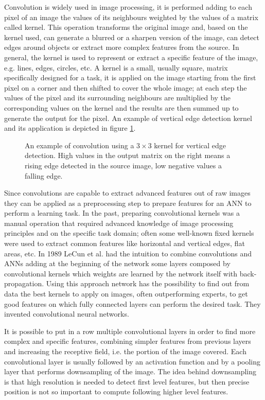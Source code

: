 Convolution is widely used in image processing, it is performed adding to each pixel of an image the values of its neighbours weighted by the values of a matrix called kernel.
This operation transforms the original image and, based on the kernel used, can generate a blurred or a sharpen version of the image, can detect edges around objects or extract more complex features from the source.
In general, the kernel is used to represent or extract a specific feature of the image, e.g. lines, edges, circles, etc.
A kernel is a small, usually square, matrix specifically designed for a task, it is applied on the image starting from the first pixel on a corner and then shifted to cover the whole image; at each step the values of the pixel and its surrounding neighbours are multiplied by the corresponding values on the kernel and the results are then summed up to generate the output for the pixel.
An example of vertical edge detection kernel and its application is depicted in figure \ref{fig:convolution}.

\begin{figure}
    \centering
    \resizebox{0.8\textwidth}{!}{  }
    \caption{An example of convolution using a $3\times3$ kernel for vertical edge detection. High values in the output matrix on the right means a rising edge detected in the source image, low negative values a falling edge.}
    \label{fig:convolution}
\end{figure}

Since convolutions are capable to extract advanced features out of raw images they can be applied as a preprocessing step to prepare features for an ANN to perform a learning task.
In the past, preparing convolutional kernels was a manual operation that required advanced knowledge of image processing principles and on the specific task domain; often some well-known fixed kernels were used to extract common features like horizontal and vertical edges, flat areas, etc.
In 1989 LeCun et al. \cite{LeCun1989} had the intuition to combine convolutions and ANNs adding at the beginning of the network some layers composed by convolutional kernels which weights are learned by the network itself with back-propagation.
Using this approach network has the possibility to find out from data the best kernels to apply on images, often outperforming experts, to get good features on which fully connected layers can perform the desired task.
They invented convolutional neural networks.

It is possible to put in a row multiple convolutional layers in order to find more complex and specific features, combining simpler features from previous layers and increasing the receptive field, i.e. the portion of the image covered.
Each convolutional layer is usually followed by an activation function and by a pooling layer that performs downsampling of the image.
The idea behind downsampling is that high resolution is needed to detect first level features, but then precise position is not so important to compute following higher level features.


